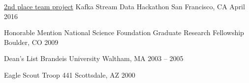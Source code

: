 



\begin{cvhonors}

  \cvhonor
    {\href{https://www.confluent.io/blog/kafka-summit-is-here/}{2nd place team project}} %
    {Kafka Stream Data Hackathon} %
    {San Francisco, CA} %
    {April 2016} %

  \cvhonor
    {Honorable Mention} %
    {National Science Foundation Graduate Research Fellowship} %
    {Boulder, CO} %
    {2009} %

  \cvhonor
    {Dean's List} %
    {Brandeis University} %
    {Waltham, MA} %
    {2003 -- 2005} %

  \cvhonor
    {Eagle Scout} %
    {Troop 441} %
    {Scottsdale, AZ} %
    {2000} %

\end{cvhonors}







